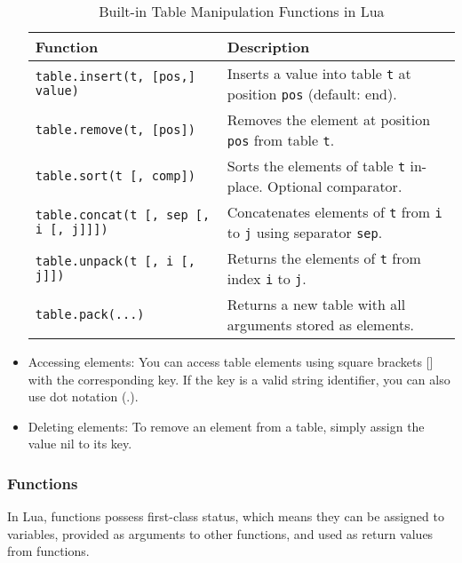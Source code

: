\begin{itemize}
\begin{table}[htbp]
\centering
\caption{Built-in Table Manipulation Functions in Lua}
\begin{tabular}{@{}ll@{}}
\toprule
\textbf{Function} & \textbf{Description} \\
\midrule
\texttt{table.insert(t, [pos,] value)} & Inserts a value into table \texttt{t} at position \texttt{pos} (default: end). \\
\texttt{table.remove(t, [pos])}        & Removes the element at position \texttt{pos} from table \texttt{t}. \\
\texttt{table.sort(t [, comp])}        & Sorts the elements of table \texttt{t} in-place. Optional comparator. \\
\texttt{table.concat(t [, sep [, i [, j]]])} & Concatenates elements of \texttt{t} from \texttt{i} to \texttt{j} using separator \texttt{sep}. \\
\texttt{table.unpack(t [, i [, j]])}   & Returns the elements of \texttt{t} from index \texttt{i} to \texttt{j}. \\
\texttt{table.pack(...)}          & Returns a new table with all arguments stored as elements. \\

\bottomrule
\end{tabular}
\end{table}






\item Accessing elements: You can access table elements using square brackets [] with the corresponding key. If the key is a valid string identifier, you can also use dot notation (.).
\item Deleting elements: To remove an element from a table, simply assign the value nil to its key.
\end{itemize}


\subsubsection{Functions} %
\label{ssub:functions}

In Lua, functions possess first-class status, which means they can be assigned to variables, provided as arguments to other functions, and used as return values from functions.

